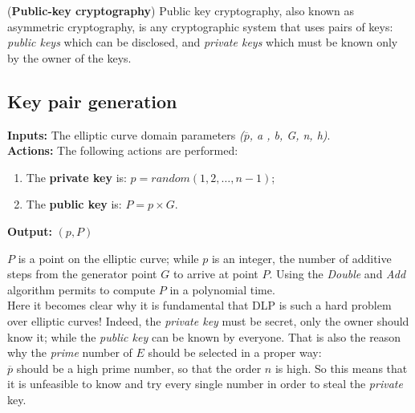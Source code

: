\begin{teorema}{(\textbf{Public-key cryptography})}
	Public key cryptography, also known as asymmetric cryptography, is any cryptographic system that uses pairs of keys: \textit{public keys} which can be disclosed, and \textit{private keys} which must be known only by the owner of the keys.
\end{teorema}

\subsection{Key pair generation}
\textbf{Inputs:} The elliptic curve domain parameters \textit{($\overline{p}$, a , b, G, n, h)}. \\
\textbf{Actions:} The following actions are performed:

\hspace{1.1cm}
\begin{minipage}[l]{2\linewidth}
	\begin{enumerate}
		\item The \textbf{private key} is: $p=random({1, 2, \dots, n-1})$;
		\item The \textbf{public key} is: $P=p\times G$.\\
	\end{enumerate}
\end{minipage}
\textbf{Output:} $(p,P)$

$P$ is a point on the elliptic curve; while $p$ is an integer, the number of additive steps from the generator point $G$ to arrive at point $P$. Using the \textit{Double} and \textit{Add} algorithm permits to compute $P$ in a polynomial time.\\
Here it becomes clear why it is fundamental that DLP is such a hard problem over elliptic curves! Indeed, the \textit{private key} must be secret, only the owner should know it; while the \textit{public key} can be known by everyone. That is also the reason why the \textit{prime} number of $E$ should be selected in a proper way:\\
$\overline{p}$ should be a high prime number, so that the order $n$ is high. So this means that it is unfeasible to know and try every single number in order to steal the \textit{private} key.
